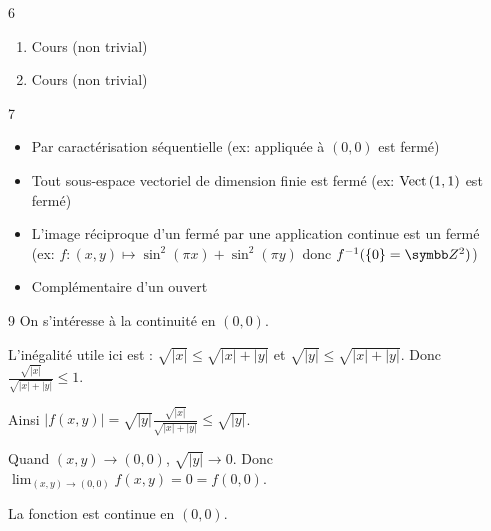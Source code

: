 \begin{correction}{6}
\begin{enumerate}
    \item Cours (non trivial)
    \item Cours (non trivial)
\end{enumerate}
\end{correction}

\begin{correction}{7}
\begin{itemize}
    \item Par caractérisation séquentielle (ex: appliquée à $(0,0)$ est fermé)
    \item Tout sous-espace vectoriel de dimension finie est fermé (ex: $\operatorname{Vect} \,(1,1)$ est fermé)
    \item L'image réciproque d'un fermé par une application continue est un fermé \\
        (ex: $f : (x,y) \mapsto \sin^2(\pi x) + \sin^2(\pi y)$ donc $f^{-1}(\{0\} = \Z^2)$)
    \item Complémentaire d'un ouvert
\end{itemize}
\end{correction}

\begin{correction}{9}
On s'intéresse à la continuité en $(0,0)$.

L'inégalité utile ici est : $\sqrt{|x|} \leqslant \sqrt{|x|+|y|}$ et $\sqrt{|y|} \leqslant \sqrt{|x|+|y|}$.
Donc $\frac{\sqrt{|x|}}{\sqrt{|x|+|y|}} \leqslant 1$.

Ainsi $|f(x,y)| = \sqrt{|y|} \frac{\sqrt{|x|}}{\sqrt{|x|+|y|}} \leqslant \sqrt{|y|}$.

Quand $(x,y) \to (0,0)$, $\sqrt{|y|} \to 0$.
Donc $\lim_{(x,y) \to (0,0)} f(x,y) = 0 = f(0,0)$.

La fonction est continue en $(0,0)$.
\end{correction}

